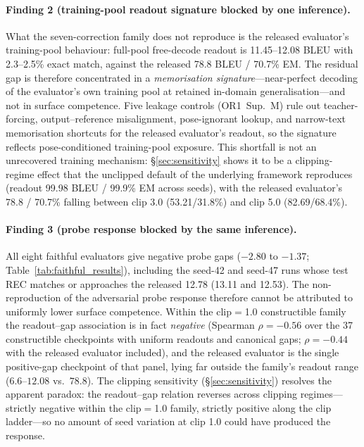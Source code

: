 \documentclass[pdflatex,sn-chicago]{sn-jnl}
\begin{document}
\paragraph{Finding 2 (training-pool readout signature blocked by one inference).}
What the seven-correction family does not reproduce is the released evaluator's training-pool behaviour: full-pool free-decode readout is 11.45--12.08 BLEU with 2.3--2.5\% exact match, against the released 78.8 BLEU / 70.7\% EM. The residual gap is therefore concentrated in a \emph{memorisation signature}---near-perfect decoding of the evaluator's own training pool at retained in-domain generalisation---and not in surface competence. Five leakage controls (OR1~Sup.~M) rule out teacher-forcing, output--reference misalignment, pose-ignorant lookup, and narrow-text memorisation shortcuts for the released evaluator's readout, so the signature reflects pose-conditioned training-pool exposure. This shortfall is not an unrecovered training mechanism: \S\ref{sec:sensitivity} shows it to be a clipping-regime effect that the unclipped default of the underlying framework reproduces (readout 99.98 BLEU / 99.9\% EM across seeds), with the released evaluator's 78.8 / 70.7\% falling between clip 3.0 (53.21/31.8\%) and clip 5.0 (82.69/68.4\%).

\paragraph{Finding 3 (probe response blocked by the same inference).}
All eight faithful evaluators give negative probe gaps ($-2.80$ to $-1.37$; Table~\ref{tab:faithful_results}), including the seed-42 and seed-47 runs whose test REC matches or approaches the released 12.78 (13.11 and 12.53). The non-reproduction of the adversarial probe response therefore cannot be attributed to uniformly lower surface competence. Within the clip$=$1.0 constructible family the readout--gap association is in fact \emph{negative} (Spearman $\rho{=}{-}0.56$ over the 37 constructible checkpoints with uniform readouts and canonical gaps; $\rho{=}{-}0.44$ with the released evaluator included), and the released evaluator is the single positive-gap checkpoint of that panel, lying far outside the family's readout range ($6.6$--$12.08$ vs.\ $78.8$). The clipping sensitivity (\S\ref{sec:sensitivity}) resolves the apparent paradox: the readout--gap relation reverses across clipping regimes---strictly negative within the clip$=$1.0 family, strictly positive along the clip ladder---so no amount of seed variation at clip 1.0 could have produced the response.
\end{document}
